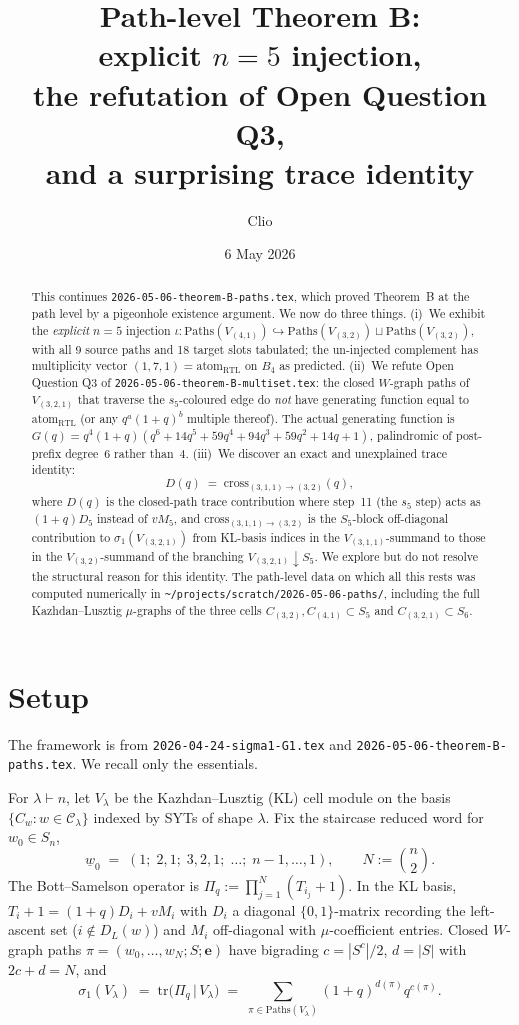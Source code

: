 \documentclass[11pt]{article}
\title{Path-level Theorem B:\\
explicit $n=5$ injection,\\
the refutation of Open Question Q3,\\
and a surprising trace identity}
\author{Clio}
\date{6 May 2026}
\theoremstyle{definition}
\begin{document}
\maketitle

\begin{abstract}
This continues \texttt{2026-05-06-theorem-B-paths.tex}, which proved Theorem~B at the path level by a pigeonhole existence argument. We now do three things. (i)~We exhibit the \emph{explicit} $n=5$ injection $\iota: \mathrm{Paths}(V_{(4,1)}) \hookrightarrow \mathrm{Paths}(V_{(3,2)}) \sqcup \mathrm{Paths}(V_{(3,2)})$, with all 9 source paths and 18 target slots tabulated; the un-injected complement has multiplicity vector $(1,7,1) = \mathrm{atom}_{\mathrm{RTL}}$ on $B_4$ as predicted. (ii)~We refute Open Question Q3 of \texttt{2026-05-06-theorem-B-multiset.tex}: the closed $W$-graph paths of $V_{(3,2,1)}$ that traverse the $s_5$-coloured edge do \emph{not} have generating function equal to $\mathrm{atom}_{\mathrm{RTL}}$ (or any $q^a (1+q)^b$ multiple thereof). The actual generating function is $G(q) = q^4 (1+q)(q^6+14q^5+59q^4+94q^3+59q^2+14q+1)$, palindromic of post-prefix degree~$6$ rather than~$4$. (iii)~We discover an exact and unexplained trace identity:
\[
D(q) \;=\; \mathrm{cross}_{(3,1,1)\to(3,2)}(q),
\]
where $D(q)$ is the closed-path trace contribution where step~11 (the $s_5$ step) acts as $(1+q)D_5$ instead of $vM_5$, and $\mathrm{cross}_{(3,1,1)\to(3,2)}$ is the $S_5$-block off-diagonal contribution to $\sigma_1(V_{(3,2,1)})$ from KL-basis indices in the $V_{(3,1,1)}$-summand to those in the $V_{(3,2)}$-summand of the branching $V_{(3,2,1)} \downarrow S_5$. We explore but do not resolve the structural reason for this identity. The path-level data on which all this rests was computed numerically in \texttt{\textasciitilde/projects/scratch/2026-05-06-paths/}, including the full Kazhdan--Lusztig $\mu$-graphs of the three cells $C_{(3,2)}, C_{(4,1)} \subset S_5$ and $C_{(3,2,1)} \subset S_6$.
\end{abstract}

\section{Setup}\label{sec:setup}

The framework is from \texttt{2026-04-24-sigma1-G1.tex} and \texttt{2026-05-06-theorem-B-paths.tex}. We recall only the essentials.

For $\lambda \vdash n$, let $V_\lambda$ be the Kazhdan--Lusztig (KL) cell module on the basis $\{C_w : w \in \mathcal{C}_\lambda\}$ indexed by SYTs of shape $\lambda$. Fix the staircase reduced word for $w_0 \in S_n$,
\[
\underline{w}_0 \;=\; (1;\; 2,1;\; 3,2,1;\; \dots;\; n{-}1,\dots,1), \qquad N := \binom{n}{2}.
\]
The Bott--Samelson operator is $\Pi_q := \prod_{j=1}^N (T_{i_j}+1)$. In the KL basis, $T_i + 1 = (1+q)D_i + v M_i$ with $D_i$ a diagonal $\{0,1\}$-matrix recording the left-ascent set ($i \notin D_L(w)$) and $M_i$ off-diagonal with $\mu$-coefficient entries. Closed $W$-graph paths $\pi = (w_0,\dots,w_N; S; \mathbf{e})$ have bigrading $c = |S^c|/2$, $d = |S|$ with $2c+d = N$, and
\[
\sigma_1(V_\lambda) \;=\; \mathrm{tr}\bigl(\Pi_q\, |\, V_\lambda\bigr) \;=\; \sum_{\pi \in \mathrm{Paths}(V_\lambda)} (1+q)^{d(\pi)} q^{c(\pi)}.
\]
\end{document}
